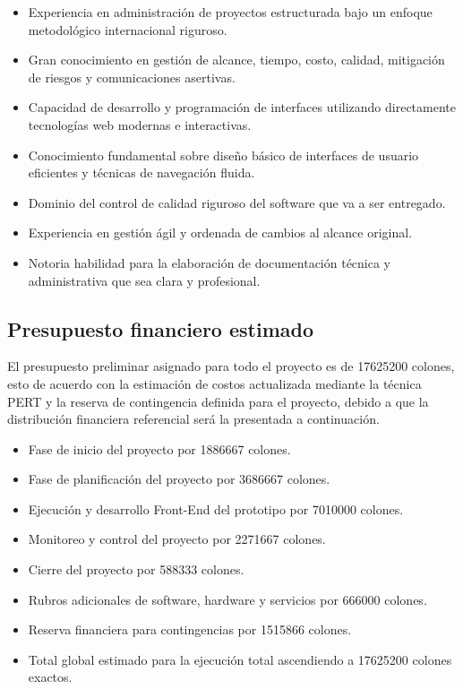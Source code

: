 \documentclass[11pt,spanish]{article}
\begin{document}
\begin{itemize}
    \item Experiencia en administración de proyectos estructurada bajo un enfoque metodológico internacional riguroso.
    \item Gran conocimiento en gestión de alcance, tiempo, costo, calidad, mitigación de riesgos y comunicaciones asertivas.
    \item Capacidad de desarrollo y programación de interfaces utilizando directamente tecnologías web modernas e interactivas.
    \item Conocimiento fundamental sobre diseño básico de interfaces de usuario eficientes y técnicas de navegación fluida.
    \item Dominio del control de calidad riguroso del software que va a ser entregado.
    \item Experiencia en gestión ágil y ordenada de cambios al alcance original.
    \item Notoria habilidad para la elaboración de documentación técnica y administrativa que sea clara y profesional.
\end{itemize}

\subsection{Presupuesto financiero estimado}

El presupuesto preliminar asignado para todo el proyecto es de 17625200 colones, esto de acuerdo con la estimación de costos actualizada mediante la técnica PERT y la reserva de contingencia definida para el proyecto, debido a que la distribución financiera referencial será la presentada a continuación.

\begin{itemize}
    \item Fase de inicio del proyecto por 1886667 colones.
    \item Fase de planificación del proyecto por 3686667 colones.
    \item Ejecución y desarrollo Front-End del prototipo por 7010000 colones.
    \item Monitoreo y control del proyecto por 2271667 colones.
    \item Cierre del proyecto por 588333 colones.
    \item Rubros adicionales de software, hardware y servicios por 666000 colones.
    \item Reserva financiera para contingencias por 1515866 colones.
    \item Total global estimado para la ejecución total ascendiendo a 17625200 colones exactos.
\end{itemize}
\end{document}
